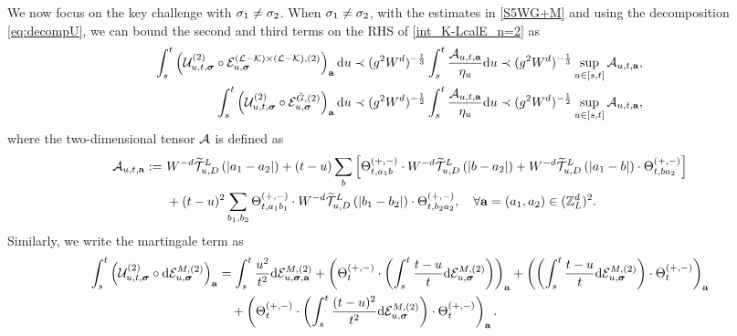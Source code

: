 We now focus on the key challenge with $\sig_1\ne \sig_2$.
When $\sig_1\ne \sig_2$, with the estimates in \eqref{S5WG+M} and using the decomposition \eqref{eq:decompU}, we can bound the second and third terms on the RHS of \eqref{int_K-LcalE_n=2} as
\begin{align}
 \int_s^t\left(\mathcal{U}^{(2)}_{u, t, \bsig} \circ \mathcal{E}_{u, \bsig}^{(\mathcal{L}-\mathcal{K}) \times(\mathcal{L}-\mathcal{K}),(2)}\right)_{\mathbf{a}} \dd u&\prec (\ilambda^2W^{d})^{-\frac13}\int_s^t \frac{{\cal A}_{u,t, \ba} }{\eta_u} \dd u \prec (\ilambda^2W^{d})^{-\frac13}\sup_{u\in[s,t]}{\cal A}_{u,t, \ba},\label{jymwons-L-K}
    \\ 
    \int_s^t\left(\mathcal{U}^{(2)}_{u, t, \bsig} \circ \mathcal{E}_{u, \bsig}^{\Gc,(2)}\right)_{\mathbf{a}} \dd u
    &\prec (\ilambda^2W^{d})^{-\frac12}\int_s^t \frac{{\cal A}_{u,t,\ba}}{\eta_u} \dd u\prec (\ilambda^2W^{d})^{-\frac12}\sup_{u\in[s,t]}{\cal A}_{u,t, \ba},\label{jymwons-Gc}
 \end{align}
where the two-dimensional tensor $\cal A$ is defined as 
\begin{align}
   {\cal A}_{u,t, \ba}:=&~W^{-d}\widetilde{\cal T}^{L}_{u,D} \p{|a_1-a_2|}+(t-u)\sum_b \br{\Theta_{t,a_1b}^{(+,-)}\cdot  W^{-d}\widetilde{  \cal T}^{L}_{u,D}\p{|b-a_2|}
+ W^{-d}\widetilde{  \cal T}^{L}_{u,D}\p{|a_1-b|}\cdot \Theta_{t, b a_2}^{(+,-)}} \nonumber\\  
&~+(t-u)^2\sum_{b_1,b_2}\Theta_{t,a_1 b_1}^{(+,-)} \cdot  W^{-d}\widetilde{ \cal T}^{L}_{u,D}\p{|b_1-b_2|} \cdot \Theta_{t,b_2a_2}^{(+,-)},\quad \forall \ba=(a_1,a_2)\in (\Zn)^2. \label{eq:def_calA5}
\end{align}
Similarly, we write the martingale term as
\begin{align}
\int_{s}^t \left(\mathcal{U}^{(2)}_{u, t, \bsig} \circ \dd \mathcal{E}^{M,(2)}_{u, \bsig}\right)_{\ba} 
&=\int_{s}^t \frac {u^2}{t^2}\dd \mathcal{E}^{M,(2)}
_{u, \bsig, {{\ba}}} 
+ \left( \Theta_{t}^{(+,-)}\cdot \p{\int_{s}^t\frac{t-u}{t}
\dd \mathcal{E}^{M,(2)}
_{u, \bsig}}\right)_{{\ba}}
+ \left(\left(\int_{s}^t
\frac{t-u}{t}\dd\mathcal{E}^{M,(2)}
_{u, \bsig}\right)\cdot\Theta_{t}^{(+,-)}  \right)_{{\ba}}\nonumber
\\
&\quad +
 \left(\Theta_{t}^{(+,-)}\cdot\left(\int_{s}^t
 \frac{(t-u)^2}{t^2}
\dd\mathcal{E}^{M,(2)}
_{u, \bsig}\right)\cdot\Theta_{t}^{(+,-)}  \right)_{{\ba}}.\label{jymwons}
\end{align}
